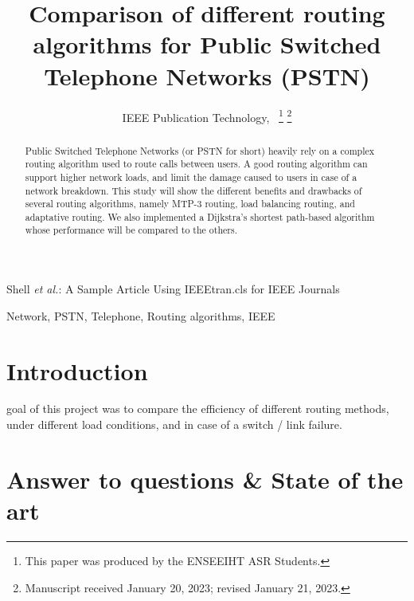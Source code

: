 \documentclass[lettersize,journal]{IEEEtran} %
\begin{document}
\title{Comparison of different routing algorithms for Public Switched Telephone Networks (PSTN)}

\author{IEEE Publication Technology,~
\thanks{This paper was produced by the ENSEEIHT ASR Students.}%
\thanks{Manuscript received January 20, 2023; revised January 21, 2023.}}

%
{Shell \MakeLowercase{\textit{et al.}}: A Sample Article Using IEEEtran.cls for IEEE Journals}


\maketitle

\begin{abstract}
        Public Switched Telephone Networks (or PSTN for short) heavily rely on a complex
        routing algorithm used to route calls between users. A good routing algorithm can
        support higher network loads, and limit the damage caused to users in case of a network
        breakdown. This study will show the different benefits and drawbacks of several routing algorithms,
        namely MTP-3 routing, load balancing routing, and adaptative routing. We also implemented a Dijkstra's 
        shortest path-based algorithm whose performance will be compared to the others.
\end{abstract}

\begin{IEEEkeywords}
Network, PSTN, Telephone, Routing algorithms, IEEE
\end{IEEEkeywords}

\section{Introduction}
 goal of this project was to compare
the efficiency of different routing methods, under different load conditions, and in case of a switch / link failure.

\section{Answer to questions \& State of the art}
\end{document}
